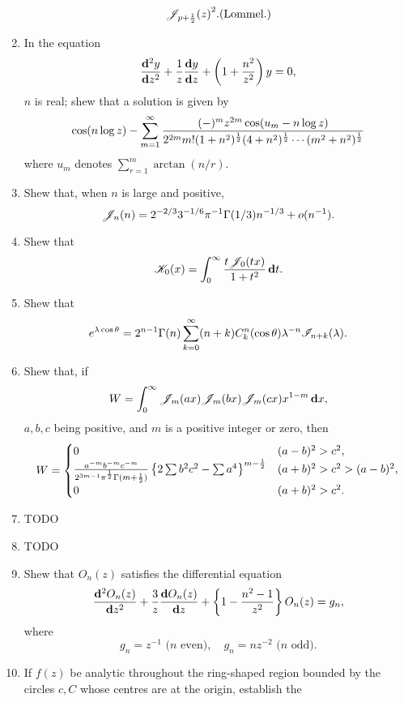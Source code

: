 \documentclass{book}
\begin{document}
\begin{enumerate}
$${    \besJ_{p+\half}(z)}^{2}.
  \addexamplecitation{Lommel.}
  $$
\item
  In the equation
  $$
  \frac{\mathbf{d}^{2} y}{\mathbf{d} z^{2}}
  + \frac{1}{z} \frac{\mathbf{d} y}{\mathbf{d} z}
  + \left(  1 + \frac{n^{2}}{z^{2}} \right) y
  = 0,
  $$
  $n$ is real; shew that a solution is given by
  $$
  \cos (n \log z)
  -
  \sum_{m=1}^{\infty}
  \frac{
    (-)^{m} z^{2m} \cos(u_{m} - n\log z)}{
    2^{2m} m! (1+n^{2})^{\frac{1}{2}}
    (4 + n^{2})^{\frac{1}{2}} \cdots (m^{2}+n^{2})^{\frac{1}{2}}}
  $$
  where $u_{m}$ denotes $\sum_{r=1}^{m} \arctan (n/r)$.
\item
  Shew that, when $n$ is large and positive,
  $$
  \mathscr{J}_{n}(n)
  =
  2^{-2/3} 3^{-1/6} \pi^{-1} \Gamma(1/3) n^{-1/3} + o(n^{-1}).
  $$
\item
  Shew that
  $$
  \mathscr{K}_{0}(x)
  =
  \int_{0}^{\infty} \frac{t \mathscr{J}_{0}(tx)}{1+t^{2}} \, \mathbf{d} t.
  $$
\item
  Shew that
  $$
  e^{\lambda\cos\theta}
  =
  2^{n-1} \Gamma(n)
  \sum_{k=0}^{\infty} (n+k) C_{k}^{n}(\cos\theta) \lambda^{-n} \mathscr{I}_{n+k}(\lambda).
  $$
\item
  Shew that, if
  $$
  W
  =
  \int_{0}^{\infty} \mathscr{J}_{m}(a x) \mathscr{J}_{m}(bx) \mathscr{J}_{m}(cx) x^{1-m}
  \, \mathbf{d} x,
  $$
  $a,b,c$ being positive, and $m$ is a positive integer or zero, then
  $$
  W =
  \begin{cases}
    0 & (a-b)^{2} > c^{2}, \\
    \frac{a^{-m} b^{-m} c^{-m}}{2^{3m-1} \pi^{\frac{1}{2}} \Gamma(m+\frac{1}{2})}
    \left\{ 2 \sum b^{2} c^{2} - \sum a^{4} \right\}^{m-\frac{1}{2}} & (a+b)^{2} >
    c^{2} > (a-b)^{2}, \\
    0 & (a+b)^{2} > c^{2}.
  \end{cases}
  $$
\item
  TODO
\item
  TODO
\item
  Shew that $O_{n}(z)$ satisfies the differential equation
  $$
  \frac{\mathbf{d}^{2} O_{n}(z)}{\mathbf{d} z^{2}}
  +
  \frac{3}{z} \frac{\mathbf{d} O_{n}(z)}{\mathbf{d} z}
  +
  \left\{ 1 - \frac{n^{2}-1}{z^{2}} \right\} O_{n}(z)
  =
  g_{n},
  $$
  where
  $$
  g_{n} = z^{-1} \textrm{ ($n$ even)},
  \quad
  g_{n} = n z^{-2} \textrm{ ($n$ odd)}.
  $$
\item
  If $f(z)$ be analytic throughout the ring-shaped region bounded by
  the circles $c,C$ whose centres are at the origin, establish the

\end{enumerate}
\end{document}
